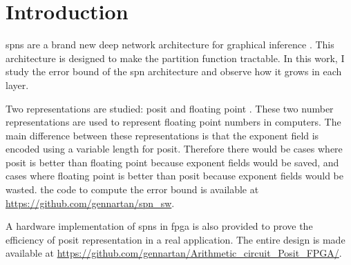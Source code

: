 
\chapter{Introduction}
\label{cha:intro}

\Glspl{spn} are a brand new deep network architecture for graphical inference \cite{spns}. This architecture is designed to make the partition function tractable. In this work, I study the error bound of the \gls{spn} architecture and observe how it grows in each layer.

Two representations are studied: posit \cite{posit_std} and floating point \cite{float_std}. These two number representations are used to represent floating point numbers in computers. The main difference between these representations is that the exponent field is encoded using a variable length for posit. Therefore there would be cases where posit is better than floating point because exponent fields would be saved, and cases where floating point is better than posit because exponent fields would be wasted. the code to compute the error bound is available at \url{https://github.com/gennartan/spn_sw}.

A hardware implementation of \glspl{spn} in \gls{fpga} is also provided to prove the efficiency of posit representation in a real application. The entire design is made available at \url{https://github.com/gennartan/Arithmetic_circuit_Posit_FPGA/}.

